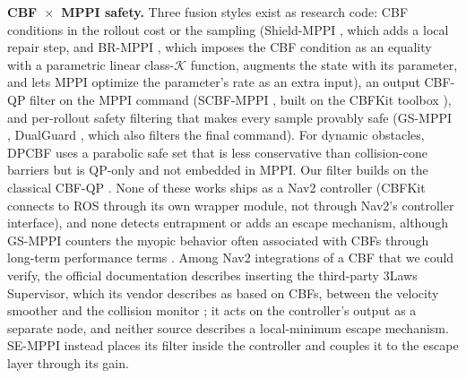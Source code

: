 \documentclass[journal]{IEEEtran}
\begin{document}
\textbf{CBF~$\times$~MPPI safety.} Three fusion styles exist as research
code: CBF conditions in the rollout cost or the sampling (Shield-MPPI
\cite{shield_mppi}, which adds a local repair step, and BR-MPPI
\cite{br_mppi}, which imposes the CBF condition as an equality with a
parametric linear class-$\mathcal{K}$ function, augments the state with
its parameter, and lets MPPI optimize the parameter's rate as an extra
input), an output CBF-QP filter on the MPPI command (SCBF-MPPI
\cite{scbf_mppi}, built on the CBFKit toolbox \cite{cbfkit}), and
per-rollout safety filtering that makes every sample provably safe
(GS-MPPI \cite{gs_mppi}, DualGuard \cite{dualguard}, which also filters
the final command). For dynamic obstacles, DPCBF \cite{dpcbf} uses a
parabolic safe set that is less conservative than collision-cone barriers
but is QP-only and not embedded in MPPI. Our filter builds on the
classical CBF-QP \cite{ames_cbf_tac,ames_cbf_ecc}. None of these works
ships as a Nav2 controller (CBFKit connects to ROS through its own wrapper module, not through Nav2's
controller interface), and none
detects entrapment or adds an escape mechanism, although GS-MPPI counters
the myopic behavior often associated with CBFs through long-term
performance terms \cite{gs_mppi}. Among Nav2 integrations of a CBF that
we could verify, the official documentation describes inserting the
third-party 3Laws Supervisor, which its vendor describes as based on
CBFs, between the velocity smoother and the collision monitor
\cite{nav2_3laws,threelaws_pr}; it acts on the controller's output as a
separate node, and neither source describes a local-minimum escape
mechanism. SE-MPPI instead places its filter inside the controller and
couples it to the escape layer through its gain.
\end{document}
